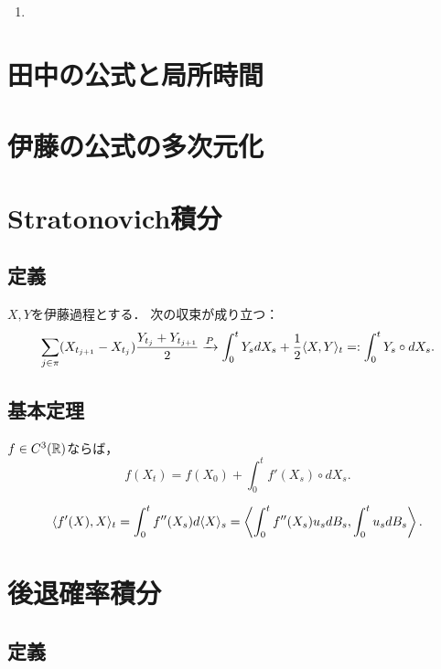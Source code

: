 \documentclass[uplatex,dvipdfmx]{jsreport}
\begin{document}
\begin{example}[種々の公式]\mbox{}
    \begin{enumerate}
        \item 
    \end{enumerate}
\end{example}

\section{田中の公式と局所時間}

\section{伊藤の公式の多次元化}

\section{Stratonovich積分}

\subsection{定義}

\begin{proposition}
    $X,Y$を伊藤過程とする．
    次の収束が成り立つ：
    \[\sum_{j\in\pi}(X_{t_{j+1}}-X_{t_j})\frac{Y_{t_j}+Y_{t_{j+1}}}{2}\xrightarrow{P}\int^t_0Y_sdX_s+\frac{1}{2}\langle X,Y\rangle_t=:\int^t_0Y_s\circ dX_s.\]
\end{proposition}

\subsection{基本定理}

\begin{proposition}
    $f\in C^3(\mathbb{R})$ならば，
    \[f(X_t)=f(X_0)+\int^t_0f'(X_s)\circ dX_s.\]
\end{proposition}

\begin{corollary}
    \[\langle f'(X),X\rangle_t=\int^t_0f''(X_s)d\langle X\rangle_s=\left\langle\int^t_0f''(X_s)u_sdB_s,\int^t_0u_sdB_s\right\rangle.\]
\end{corollary}

\section{後退確率積分}

\subsection{定義}
\end{document}

